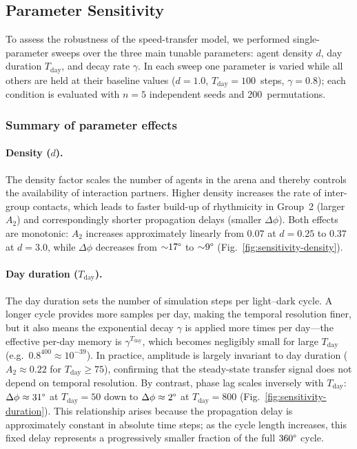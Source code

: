 \documentclass{article}
\newcommand{\added}[1]{{\color{blue}#1}}
\newcommand{\added}[1]{#1}
\begin{document}
\subsection{\added{Parameter Sensitivity}}

\added{To assess the robustness of the speed-transfer model, we performed single-parameter sweeps over the three main tunable parameters: agent density $d$, day duration $T_{\mathrm{day}}$, and decay rate $\gamma$.  In each sweep one parameter is varied while all others are held at their baseline values ($d{=}1.0$, $T_{\mathrm{day}}{=}100$~steps, $\gamma{=}0.8$); each condition is evaluated with $n{=}5$ independent seeds and 200~permutations.}

\subsubsection*{\added{Summary of parameter effects}}

\paragraph{Density ($d$).}
\added{The density factor scales the number of agents in the arena and thereby controls the availability of interaction partners.  Higher density increases the rate of inter-group contacts, which leads to faster build-up of rhythmicity in Group~2 (larger $A_2$) and correspondingly shorter propagation delays (smaller $\Delta\phi$).  Both effects are monotonic: $A_2$ increases approximately linearly from $0.07$ at $d{=}0.25$ to $0.37$ at $d{=}3.0$, while $\Delta\phi$ decreases from ${\sim}17\text{\textdegree}$ to ${\sim}9\text{\textdegree}$ (Fig.~\ref{fig:sensitivity-density}).}

\paragraph{Day duration ($T_{\mathrm{day}}$).}
\added{The day duration sets the number of simulation steps per light--dark cycle.  A longer cycle provides more samples per day, making the temporal resolution finer, but it also means the exponential decay $\gamma$ is applied more times per day---the effective per-day memory is $\gamma^{T_{\mathrm{day}}}$, which becomes negligibly small for large $T_{\mathrm{day}}$ (e.g.\ $0.8^{400}\!\approx\!10^{-39}$).  In practice, amplitude is largely invariant to day duration ($A_2 \approx 0.22$ for $T_{\mathrm{day}} \geq 75$), confirming that the steady-state transfer signal does not depend on temporal resolution.  By contrast, phase lag scales inversely with $T_{\mathrm{day}}$: $\Delta\phi \approx 31\text{\textdegree}$ at $T_{\mathrm{day}}{=}50$ down to $\Delta\phi \approx 2\text{\textdegree}$ at $T_{\mathrm{day}}{=}800$ (Fig.~\ref{fig:sensitivity-duration}).  This relationship arises because the propagation delay is approximately constant in absolute time steps; as the cycle length increases, this fixed delay represents a progressively smaller fraction of the full $360\text{\textdegree}$ cycle.}
\end{document}
